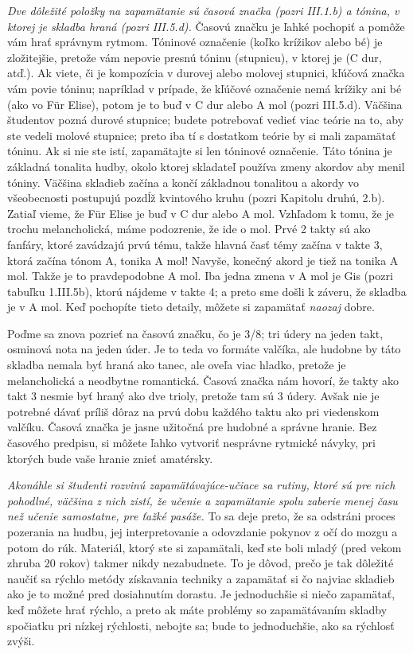 \emph{Dve dôležité položky na zapamätanie sú časová značka (pozri III.1.b) a tónina, v ktorej je skladba hraná (pozri III.5.d).} Časovú značku je ľahké pochopiť a pomôže vám hrať správnym rytmom. Tóninové označenie (koľko krížikov alebo bé) je zložitejšie, pretože vám nepovie presnú tóninu (stupnicu), v ktorej je (C dur, atď.). Ak viete, či je kompozícia v durovej alebo molovej stupnici, kľúčová značka vám povie tóninu; napríklad v prípade, že kľúčové označenie nemá krížiky ani bé (ako vo Für Elise), potom je to buď v C dur alebo A mol (pozri III.5.d). Väčšina študentov pozná durové stupnice; budete potrebovať vedieť viac teórie na to, aby ste vedeli molové stupnice; preto iba tí s dostatkom teórie by si mali zapamätať tóninu. Ak si nie ste istí, zapamätajte si len tóninové označenie. Táto tónina je základná tonalita hudby, okolo ktorej skladateľ používa zmeny akordov aby menil tóniny. Väčšina skladieb začína a končí základnou tonalitou a akordy vo všeobecnosti postupujú pozdĺž kvintového kruhu (pozri Kapitolu druhú, 2.b). Zatiaľ vieme, že Für Elise je buď v C dur alebo A mol. Vzhľadom k tomu, že je trochu melancholická, máme podozrenie, že ide o mol. Prvé 2 takty sú ako fanfáry, ktoré  zavádzajú prvú tému, takže hlavná časť témy začína v takte 3, ktorá začína tónom A, tonika A mol! Navyše, konečný akord je tiež na tonika A mol. Takže je to pravdepodobne A mol. Iba jedna zmena v A mol je Gis (pozri tabuľku 1.III.5b), ktorú nájdeme v takte 4; a preto sme došli k záveru, že skladba je v A mol. Keď pochopíte tieto detaily, môžete si zapamätať \textit{naozaj} dobre.

Poďme sa znova pozrieť na časovú značku, čo je 3/8; tri údery na jeden takt, osminová nota na jeden úder. Je to teda vo formáte valčíka, ale hudobne by táto skladba nemala byť hraná ako tanec, ale oveľa viac hladko, pretože je melancholická a neodbytne romantická. Časová značka nám hovorí, že takty ako takt 3 nesmie byť hraný ako dve trioly, pretože tam sú 3 údery. Avšak nie je potrebné dávať príliš dôraz na prvú dobu každého taktu ako pri viedenskom valčíku. Časová značka je jasne užitočná pre hudobné a správne hranie. Bez časového predpisu, si môžete ľahko vytvoriť nesprávne rytmické návyky, pri ktorých bude vaše hranie znieť amatérsky.

\emph{Akonáhle si študenti rozvinú zapamätávajúce-učiace sa rutiny, ktoré sú pre nich pohodlné, väčšina z nich zistí, že učenie a zapamätanie spolu zaberie menej času než učenie samostatne, pre ťažké pasáže.} To sa deje preto, že sa odstráni proces pozerania na hudbu, jej interpretovanie a odovzdanie pokynov z očí do mozgu a potom do rúk. Materiál, ktorý ste si zapamätali, keď ste boli mladý (pred vekom zhruba 20 rokov) takmer nikdy nezabudnete. To je dôvod, prečo je tak dôležité naučiť sa rýchlo metódy získavania techniky a zapamätať si čo najviac skladieb ako je to možné pred dosiahnutím dorastu. Je jednoduchšie si niečo zapamätať, keď môžete hrať rýchlo, a preto ak máte problémy so zapamätávaním skladby spočiatku pri nízkej rýchlosti, nebojte sa; bude to jednoduchšie, ako sa rýchlosť zvýši.

